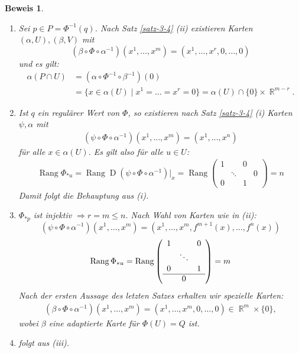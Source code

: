 \documentclass[paper=A4, twoside, chapterprefix=true, bibliography=totoc, headsepline]{scrbook}
\DeclareMathOperator{\R}{\mathbb{R}}
\DeclareMathOperator{\D}{D}         %
\DeclareMathOperator{\Rang}{Rang}   %
\theoremstyle{plain}
\theoremstyle{nonumberplain}
\newtheorem{bew}{Beweis}
\theoremstyle{empty}
\theoremstyle{break}
\begin{document}
\begin{bew}\begin{enumerate}[label=(\roman*),widest=iii,leftmargin=*]
\item
	Sei $p \in P = \Phi^{-1}(q)$. Nach Satz \ref{satz-3-4} (ii) existieren Karten $(\alpha,U), (\beta, V)$ mit 
		\[ (\beta \circ \Phi \circ \alpha^{-1})(x^1,\ldots,x^m) = (x^1, \ldots,x^r, 0, \ldots, 0) \]
	und es gilt:
	\begin{align*}
		\alpha(P \cap U) & = (\alpha \circ \Phi^{-1} \circ \beta^{-1})(0) \\
		& = \{x \in \alpha (U) \mid x^1 = \ldots = x^r = 0\} = \alpha(U) \cap \{0\} \times \R^{m-r}.
	\end{align*} 
\item
	Ist $q$ ein regul\"arer Wert von $\Phi$, so existieren nach Satz \ref{satz-3-4} (i) Karten $\psi, \alpha$ mit 
	\begin{align*}
		(\psi \circ \Phi \circ \alpha^{-1})(x^1, \ldots, x^m) = (x^1, \ldots, x^n) \tag{$m  \geq n = r$}
	\end{align*}
	f\"ur alle $x \in \alpha(U)$. Es gilt also f\"ur alle $u \in U$:
	\begin{align*}
		\Rang \Phi_{*u} = \Rang \D(\psi \circ \Phi \circ \alpha^{-1})|_x = \Rang
		\left(\begin{array}{ccc|c}
			1 &  & 0 & \\
			& \ddots & & 0 \\
			0 & & 1 & 
		\end{array}\right)
		= n
	\end{align*}
	Damit folgt die Behauptung aus (i).
\item
	$\Phi_{*p}$ ist injektiv $\Rightarrow r = m \leq n$. Nach Wahl von Karten wie in (ii):
		\[ (\psi \circ \Phi \circ \alpha^{-1})(x^1, \ldots, x^m) = (x^1, \ldots, x^m,f^{m+1}(x), \ldots, f^n(x)) \]
		\[\Rang \Phi_{*u} = \Rang 
			\left( \begin{array}{ccc}
				1 & & 0 \\
				& \ddots &  \\
				0 & & 1 \\
				\hline
				& 0      & 
			\end{array} \right)
		= m \]
	Nach der ersten Aussage des letzten Satzes erhalten wir spezielle Karten:
	\begin{align*}
		(\beta \circ \Phi \circ \alpha^{-1})(x^1, \ldots, x^m) = (x^1, \ldots, x^m, 0, \ldots, 0) \in \R^{m} \times \{0\},
	\end{align*}
	wobei $\beta$ eine adaptierte Karte f\"ur $\Phi(U) = Q$ ist.
\item
	folgt aus (iii).
\end{enumerate}\end{bew}
\end{document}
